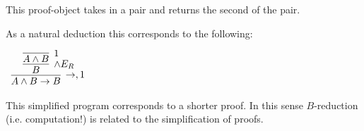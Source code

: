 \documentclass[11pt]{report}
\begin{document}
\begin{enumerate}
		This proof-object takes in a pair and returns the second of the pair. 
		
		As a natural deduction this corresponds to the following: 

		\begin{center}
			$\begin{array}{c}		
				\infer[\to, 1]{A \land B \to B}
					{\infer[\land E_{R}]{B}
						{\infer[1]{A \land B}
							{}}}
			\end{array}$
		\end{center}

		This simplified program corresponds to a shorter proof. In this sense $ B$-reduction (i.e. computation!) is related to the simplification of proofs. 

\end{enumerate}
	
\end{document}
